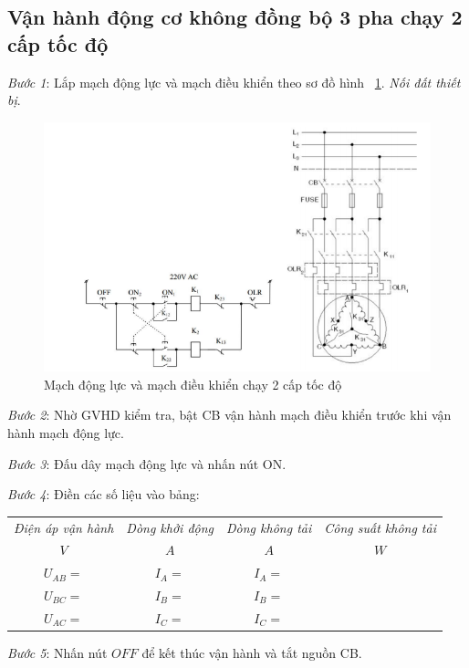 \documentclass[13pt,a4paper]{extarticle}
\begin{document}
\subsection{Vận hành động cơ không đồng bộ 3 pha chạy 2 cấp tốc độ}
\begin{list}{--}{}
\item \textit{Bước 1}: Lắp mạch động lực và mạch điều khiển theo sơ đồ hình ~\ref{Fig:3}. \textit{Nối đất thiết bị}.
\begin{figure}[!h]
\begin{center}
\includegraphics[scale=.6]{3}
\end{center}
\caption{Mạch động lực và mạch điều khiển chạy 2 cấp tốc độ}\label{Fig:3}
\end{figure}
\item \textit{Bước 2}: Nhờ GVHD kiểm tra, bật CB vận hành mạch điều khiển trước khi vận hành mạch động lực. 
\item \textit{Bước 3}: Đấu dây mạch động lực và nhấn nút ON.
\item \textit{Bước 4}: Điền các số liệu vào bảng:
\begin{center}
\begin{tabular}{|c|c|c|c|}\hline
\textit{Điện áp vận hành} & \textit{Dòng khởi động} & \textit{Dòng không tải} & \textit{Công suất không tải}\\ 
$V$ & $A$ & $A$ & $W$ \\ \hline
$U_{AB}= $&$I_A = $ & $I_A = $ & \\ \hline
$U_{BC}= $&$I_B = $ & $I_B = $ & \\ \hline
$U_{AC}= $&$I_C = $ & $I_C = $ & \\ \hline
\end{tabular}
\end{center}
\item \textit{Bước 5}: Nhấn nút $OFF$ để kết thúc vận hành và tắt nguồn CB.
\end{list}
\end{document}
